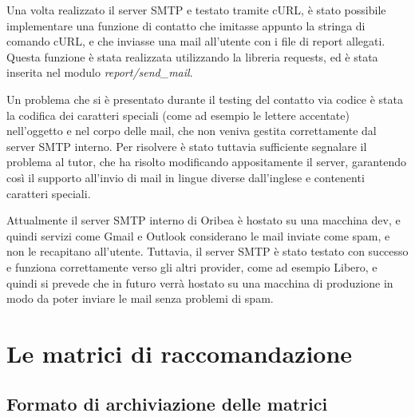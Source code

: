 Una volta realizzato il server SMTP e testato tramite cURL, è stato possibile implementare una funzione di contatto che imitasse appunto la stringa di comando cURL, e che inviasse una mail all'utente con i file di report allegati. Questa funzione è stata realizzata utilizzando la libreria requests, ed è stata inserita nel modulo \emph{report/send\_mail}.

Un problema che si è presentato durante il testing del contatto via codice è stata la codifica dei caratteri speciali (come ad esempio le lettere accentate) nell'oggetto e nel corpo delle mail, che non veniva gestita correttamente dal server SMTP interno. Per risolvere è stato tuttavia sufficiente segnalare il problema al tutor, che ha risolto modificando appositamente il server, garantendo così il supporto all'invio di mail in lingue diverse dall'inglese e contenenti caratteri speciali.

Attualmente il server SMTP interno di Oribea è hostato su una macchina dev, e quindi servizi come Gmail e Outlook considerano le mail inviate come spam, e non le recapitano all'utente. Tuttavia, il server SMTP è stato testato con successo e funziona correttamente verso gli altri provider, come ad esempio Libero, e quindi si prevede che in futuro verrà hostato su una macchina di produzione in modo da poter inviare le mail senza problemi di spam.


\section{Le matrici di raccomandazione}

\subsection{Formato di archiviazione delle matrici}

